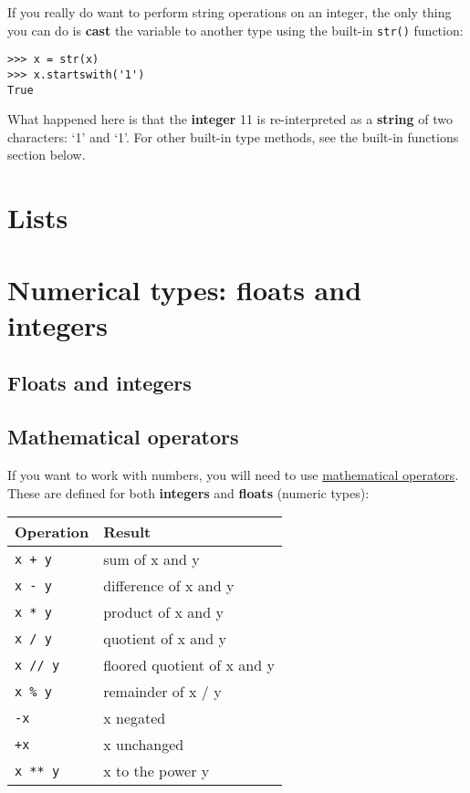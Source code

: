 \documentclass[12pt]{book}
\begin{document}
If you really do want to perform string operations on an integer, the only thing
you can do is \textbf{cast} the variable to another type using the built-in \texttt{str()} function:

\begin{lstlisting}
>>> x = str(x)
>>> x.startswith('1')
True
\end{lstlisting}

What happened here is that the \textbf{integer} 11 is re-interpreted as a \textbf{string} of two characters:
`1' and `1'. For other built-in type methods, see the built-in functions section below.

\section{Lists}

\section{Numerical types: floats and integers}

\subsection{Floats and integers}

\subsection{Mathematical operators}
If you want to work with numbers, you will need to use 
\href{https://docs.python.org/3/library/stdtypes.html\#numeric-types-int-float-complex}{mathematical
operators}. These are defined for both \textbf{integers} and
\textbf{floats} (numeric types):

\begin{table}[h]
\centering
\begin{tabular}{ll}
\toprule
Operation & Result\\
\midrule
\texttt{x\ +\ y} & sum of x and y\\
\texttt{x\ -\ y} & difference of x and y\\
\texttt{x\ *\ y} & product of x and y\\
\texttt{x\ /\ y} & quotient of x and y\\
\texttt{x\ //\ y} & floored quotient of x and y\\
\texttt{x\ \%\ y} & remainder of x / y\\
\texttt{-x} & x negated\\
\texttt{+x} & x unchanged\\
\texttt{x\ **\ y} & x to the power y\\
\bottomrule
\end{tabular}
\end{table}
\end{document}
